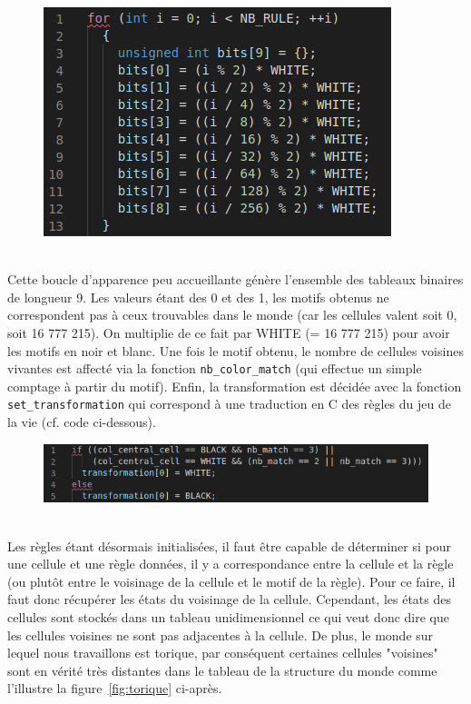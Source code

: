 \documentclass[a4paper]{article}
\begin{document}
\begin{figure}[htb]
    \centering
    \includegraphics[scale=0.8]{img/boucle.png}
\end{figure}
\\\indent Cette boucle d'apparence peu accueillante génère l'ensemble des tableaux binaires de longueur 9. Les valeurs étant des 0 et des 1, les motifs obtenus ne correspondent pas à ceux trouvables dans le monde (car les cellules valent soit 0, soit 16 777 215). On multiplie de ce fait par {\small WHITE} (= 16 777 215) pour avoir les motifs en noir et blanc.
Une fois le motif obtenu, le nombre de cellules voisines vivantes est affecté via la fonction \texttt{nb\_color\_match} (qui effectue un simple comptage à partir du motif). Enfin, la transformation est décidée avec la fonction \texttt{set\_transformation} qui correspond à une traduction en C des règles du jeu de la vie (cf. code ci-dessous).
\begin{figure}[htb]
    \centering
    \includegraphics[scale=0.8]{img/nb_match.png}
\end{figure}
\\\indent Les règles étant désormais initialisées, il faut être capable de déterminer si pour une cellule et une règle données, il y a correspondance entre la cellule et la règle (ou plutôt entre le voisinage de la cellule et le motif de la règle). Pour ce faire, il faut donc récupérer les états du voisinage de la cellule. Cependant, les états des cellules sont stockés dans un tableau unidimensionnel ce qui veut donc dire que les cellules voisines ne sont pas adjacentes à la cellule. De plus, le monde sur lequel nous travaillons est torique, par conséquent certaines cellules "voisines" sont en vérité très distantes dans le tableau de la structure du monde comme l'illustre la figure~\ref{fig:torique} ci-après.\\
\end{document}
